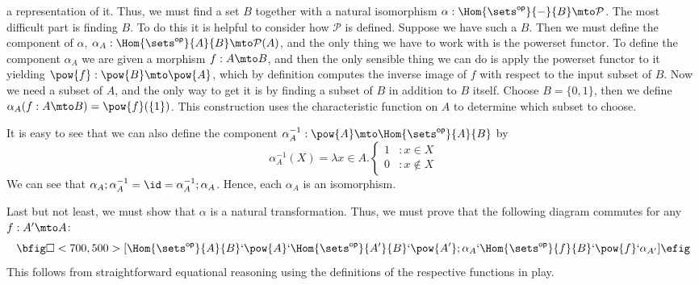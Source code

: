 \begin{enumerate}
  a representation of it.  Thus, we must find a set $B$ together with
  a natural isomorphism $\alpha : \Hom{\sets^{\mathsf{op}}}{-}{B} \mto \mathcal{P}$.  The
  most difficult part is finding $B$.  To do this it is helpful to
  consider how $\mathcal{P}$ is defined.  Suppose we have such a $B$.
  Then we must define the component of $\alpha$, $\alpha_A :
  \Hom{\sets^{\mathsf{op}}}{A}{B} \mto \mathcal{P}(A)$, and the only thing we have to work
  with is the powerset functor.  To define the component $\alpha_A$ we
  are given a morphism $f : A \mto B$, and then the only sensible thing
  we can do is apply the powerset functor to it yielding $\pow{f} :
  \pow{B} \mto \pow{A}$, which by definition computes the inverse image
  of $f$ with respect to the input subset of $B$.  Now we need a
  subset of $A$, and the only way to get it is by finding a subset of
  $B$ in addition to $B$ itself.  Choose $B = \{0,1\}$, then we define
  $\alpha_A(f : A \mto B) = \pow{f}(\{1\})$.  This construction uses
  the characteristic function on $A$ to determine which subset to
  choose.

  It is easy to see that we can also define the component
  $\alpha^{-1}_A : \pow{A} \mto \Hom{\sets^{\mathsf{op}}}{A}{B}$ by
  \begin{displaymath}
    \alpha^{-1}_A(X)  = \lambda x \in A.\left\{
    \begin{array}{lr}
      1 & : x \in X\\
      0 & : x \notin X
    \end{array}
    \right.
  \end{displaymath}
  We can see that $\alpha_A;\alpha^{-1}_A = \id =
  \alpha^{-1}_A;\alpha_A$.  Hence, each $\alpha_A$ is an 
  isomorphism.

  Last but not least, we must show that $\alpha$ is a natural
  transformation.  Thus, we must prove that the following diagram
  commutes for any $f : A' \mto A$:
  \[\bfig
  \square<700,500>[\Hom{\sets^{\mathsf{op}}}{A}{B}`\pow{A}`\Hom{\sets^{\mathsf{op}}}{A'}{B}`\pow{A'};\alpha_A`\Hom{\sets^{\mathsf{op}}}{f}{B}`\pow{f}`\alpha_{A'}]
  \efig\] This follows from straightforward equational reasoning using
  the definitions of the respective functions in play.  


\end{enumerate}
